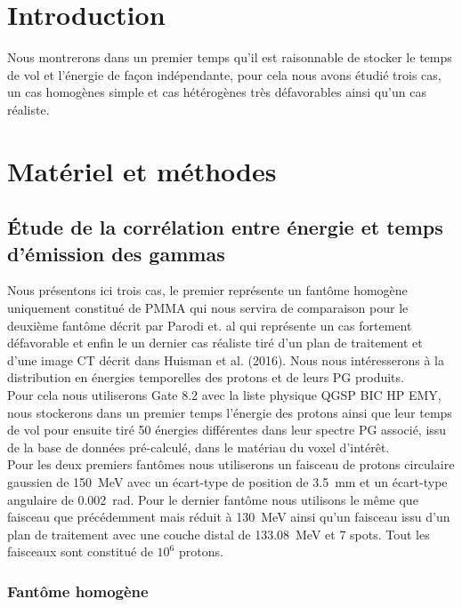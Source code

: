 \documentclass[11pt,a4paper,oldfontcommands]{memoir}
\begin{document}
\section{Introduction}

 Nous montrerons dans un premier temps qu'il est raisonnable de stocker le temps de vol et l’énergie de façon indépendante, pour cela nous avons étudié trois cas, un cas homogènes simple et cas hétérogènes très défavorables ainsi qu'un cas réaliste. 

\section{Matériel et méthodes}

\subsection{\'Etude de la corrélation entre énergie et temps d'émission des gammas}

Nous présentons ici trois cas, le premier représente un fantôme homogène uniquement constitué de PMMA qui nous servira de comparaison pour le deuxième fantôme décrit par Parodi et. al \cite{1487723} qui représente un cas fortement défavorable et enfin le un dernier cas réaliste tiré d'un plan de traitement et d'une image CT décrit dans Huisman et al. (2016). Nous nous intéresserons à la distribution en énergies temporelles des protons et de leurs PG produits.\\ Pour cela nous utiliserons Gate 8.2 avec la liste physique QGSP BIC HP EMY, nous stockerons dans un premier temps l'énergie des protons ainsi que leur temps de vol pour ensuite tiré 50 énergies différentes dans leur spectre PG associé, issu de la base de données pré-calculé, dans le matériau du voxel d'intérêt.\\
Pour les deux premiers fantômes nous utiliserons un faisceau de protons circulaire gaussien de 150~MeV avec un écart-type de position de 3.5~mm et un écart-type angulaire de 0.002~rad. Pour le dernier fantôme nous utilisons le même que faisceau que précédemment mais réduit à 130~MeV ainsi qu'un faisceau issu d'un plan de traitement avec une couche distal de 133.08~MeV et 7 spots. Tout les faisceaux sont constitué de $10^6$ protons. 

\subsubsection{Fantôme homogène}
\end{document}
